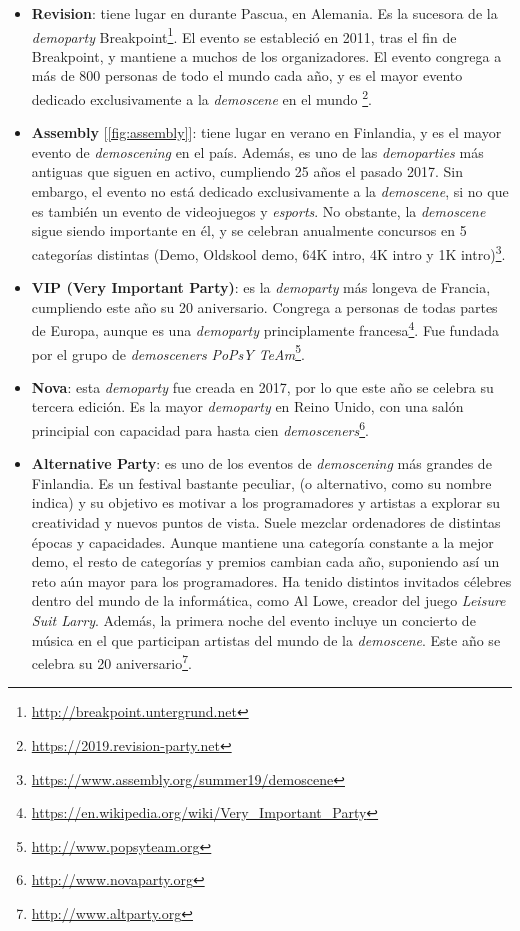 \begin{itemize}
	\item \textbf{Revision}: tiene lugar en durante Pascua, en Alemania. Es la sucesora de la \emph{demoparty} Breakpoint\footnote{\url{http://breakpoint.untergrund.net}}. El evento se estableció en 2011, tras el fin de Breakpoint, y mantiene a muchos de los organizadores. El evento congrega a más de 800 personas de todo el mundo cada año, y es el mayor evento dedicado exclusivamente a la \emph{demoscene} en el mundo \footnote{\url{https://2019.revision-party.net}}.
	\item \textbf{Assembly} [\ref{fig:assembly}]: tiene lugar en verano en Finlandia, y es el mayor evento de \emph{demoscening} en el país. Además, es uno de las \emph{demoparties} más antiguas que siguen en activo, cumpliendo 25 años el pasado 2017. Sin embargo, el evento no está dedicado exclusivamente a la \emph{demoscene}, si no que es también un evento de videojuegos y \emph{esports}. No obstante, la \emph{demoscene} sigue siendo importante en él, y se celebran anualmente concursos en 5 categorías distintas (Demo, Oldskool demo, 64K intro, 4K intro y 1K intro)\footnote{\url{https://www.assembly.org/summer19/demoscene}}.
	\item \textbf{VIP (Very Important Party)}: es la \emph{demoparty} más longeva de Francia, cumpliendo este año su 20 aniversario. Congrega a personas de todas partes de Europa, aunque es una \emph{demoparty} principlamente francesa\footnote{\url{https://en.wikipedia.org/wiki/Very_Important_Party}}. Fue fundada por el grupo de \emph{demosceners} \emph{PoPsY TeAm}\footnote{\url{http://www.popsyteam.org}}.
	\item \textbf{Nova}: esta \emph{demoparty} fue creada en 2017, por lo que este año se celebra su tercera edición. Es la mayor \emph{demoparty} en Reino Unido, con una salón principial con capacidad para hasta cien \emph{demosceners}\footnote{\url{http://www.novaparty.org}}.
	\item  \textbf{Alternative Party}: es uno de los eventos de \emph{demoscening} más grandes de Finlandia. Es un festival bastante peculiar, (o alternativo, como su nombre indica) y su objetivo es motivar a los programadores y artistas a explorar su creatividad y nuevos puntos de vista. Suele mezclar ordenadores de distintas épocas y capacidades. Aunque mantiene una categoría constante a la mejor demo, el resto de categorías y premios cambian cada año, suponiendo así un reto aún mayor para los programadores. Ha tenido distintos invitados célebres dentro del mundo de la informática, como Al Lowe, creador del juego \emph{Leisure Suit Larry}. Además, la primera noche del evento incluye un concierto de música en el que participan artistas del mundo de la \emph{demoscene}. Este año se celebra su 20 aniversario\footnote{\url{http://www.altparty.org}}. 

\end{itemize}
